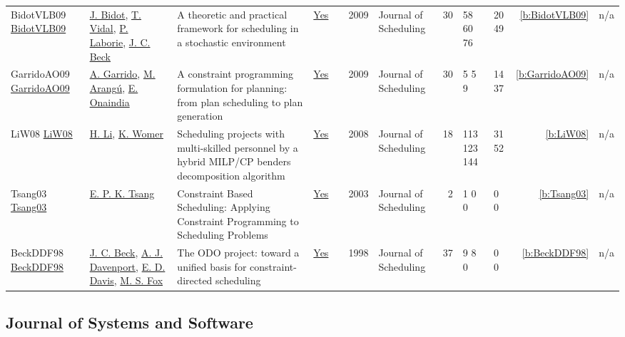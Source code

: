 {\begin{longtable}{>{\raggedright\arraybackslash}p{3cm}>{\raggedright\arraybackslash}p{4.5cm}>{\raggedright\arraybackslash}p{6.0cm}rrrp{2.5cm}rp{1cm}p{1cm}rr}
BidotVLB09 \href{https://doi.org/10.1007/s10951-008-0080-x}{BidotVLB09} & \hyperref[auth:a824]{J. Bidot}, \hyperref[auth:a825]{T. Vidal}, \hyperref[auth:a118]{P. Laborie}, \hyperref[auth:a89]{J. C. Beck} & A theoretic and practical framework for scheduling in a stochastic environment & \href{../works/BidotVLB09.pdf}{Yes} & \cite{BidotVLB09} & 2009 & Journal of Scheduling & 30 & 58 60 76 & 20 49 & \ref{b:BidotVLB09} & n/a\\
GarridoAO09 \href{https://doi.org/10.1007/s10951-008-0083-7}{GarridoAO09} & \hyperref[auth:a633]{A. Garrido}, \hyperref[auth:a634]{M. Arang{\'{u}}}, \hyperref[auth:a635]{E. Onaindia} & A constraint programming formulation for planning: from plan scheduling to plan generation & \href{../works/GarridoAO09.pdf}{Yes} & \cite{GarridoAO09} & 2009 & Journal of Scheduling & 30 & 5 5 9 & 14 37 & \ref{b:GarridoAO09} & n/a\\
LiW08 \href{http://dx.doi.org/10.1007/s10951-008-0079-3}{LiW08} & \hyperref[auth:a953]{H. Li}, \hyperref[auth:a954]{K. Womer} & Scheduling projects with multi-skilled personnel by a hybrid MILP/CP benders decomposition algorithm & \href{../works/LiW08.pdf}{Yes} & \cite{LiW08} & 2008 & Journal of Scheduling & 18 & 113 123 144 & 31 52 & \ref{b:LiW08} & n/a\\
Tsang03 \href{https://doi.org/10.1023/A:1024016929283}{Tsang03} & \hyperref[auth:a665]{E. P. K. Tsang} & Constraint Based Scheduling: Applying Constraint Programming to Scheduling Problems & \href{../works/Tsang03.pdf}{Yes} & \cite{Tsang03} & 2003 & Journal of Scheduling & 2 & 1 0 0 & 0 0 & \ref{b:Tsang03} & n/a\\
BeckDDF98 \href{http://dx.doi.org/10.1002/(sici)1099-1425(199808)1:2<89::aid-jos9>3.0.co;2-h}{BeckDDF98} & \hyperref[auth:a89]{J. C. Beck}, \hyperref[auth:a248]{A. J. Davenport}, \hyperref[auth:a1219]{E. D. Davis}, \hyperref[auth:a302]{M. S. Fox} & The ODO project: toward a unified basis for constraint-directed scheduling & \href{../works/BeckDDF98.pdf}{Yes} & \cite{BeckDDF98} & 1998 & Journal of Scheduling & 37 & 9 8 0 & 0 0 & \ref{b:BeckDDF98} & n/a\\
\end{longtable}
}

\subsection{Journal of Systems and Software}

